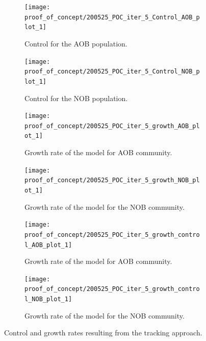\documentclass[3p,times]{article}
\begin{document}
\begin{figure}[h]
	\centering
	\begin{subfigure}{0.45 \linewidth}
		\texttt{[image: proof\_of\_concept/200525\_POC\_iter\_5\_Control\_AOB\_plot\_1]}
	\caption{Control for the AOB population.}
	\label{Control AOB no noise}
	\end{subfigure}
	\begin{subfigure}{0.45 \linewidth}
		\centering
		\texttt{[image: proof\_of\_concept/200525\_POC\_iter\_5\_Control\_NOB\_plot\_1]}
	\caption{Control for the NOB population.}
	\label{Control NOB no noise}
	\end{subfigure}

	\begin{subfigure}{0.45 \linewidth}
		\texttt{[image: proof\_of\_concept/200525\_POC\_iter\_5\_growth\_AOB\_plot\_1]}
		\caption{Growth rate of the model for AOB community.}
		\label{AOB_growth_POC}
	\end{subfigure}
	\begin{subfigure}{0.45 \linewidth}
		\centering
		\texttt{[image: proof\_of\_concept/200525\_POC\_iter\_5\_growth\_NOB\_plot\_1]}
	\caption{Growth rate of the model for the NOB community.}
	\label{NOB_growth_POC}
	\end{subfigure}

	\begin{subfigure}{0.45 \linewidth}
		\texttt{[image: proof\_of\_concept/200525\_POC\_iter\_5\_growth\_control\_AOB\_plot\_1]}
		\caption{Growth rate of the model for AOB community.}
		\label{AOB_growth_control_POC}
	\end{subfigure}
	\begin{subfigure}{0.45 \linewidth}
		\centering
		\texttt{[image: proof\_of\_concept/200525\_POC\_iter\_5\_growth\_control\_NOB\_plot\_1]}
		\caption{Growth rate of the model for the NOB community.}
		\label{NOB_growth_control_POC}
	\end{subfigure}
	\caption{Control and growth rates resulting from the tracking approach.}
	\label{POC_control}
\end{figure}

\end{document}
